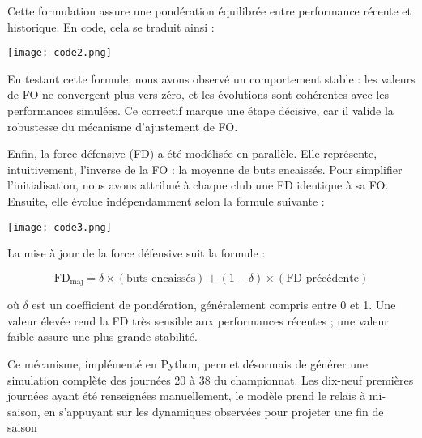 \documentclass[12pt]{report}
\begin{document}
Cette formulation assure une pondération équilibrée entre performance récente et historique. En code, cela se traduit ainsi :


\begin{tcolorbox}[
  colback=white, colframe=red!80!black,
  title=\textcolor{white}{\textbf{Mise à jour de la FO}},
  coltitle=white, colbacktitle=red!80!black,
  boxrule=0.8pt,
  left=4pt, right=4pt, top=5pt, bottom=5pt,
  boxsep=5pt, %
  enhanced, sharp corners
]
\centering
\texttt{[image: code2.png]}
\end{tcolorbox}




En testant cette formule, nous avons observé un comportement stable : les valeurs de FO ne convergent plus vers zéro, et les évolutions sont cohérentes avec les performances simulées. Ce correctif marque une étape décisive, car il valide la robustesse du mécanisme d’ajustement de FO.

Enfin, la force défensive (FD) a été modélisée en parallèle. Elle représente, intuitivement, l’inverse de la FO : la moyenne de buts encaissés. Pour simplifier l’initialisation, nous avons attribué à chaque club une FD identique à sa FO. Ensuite, elle évolue indépendamment selon la formule suivante :
\begin{tcolorbox}[
  colback=white, colframe=red!80!black,
  title=\textcolor{white}{\textbf{Mise à jour de la FD}},
  coltitle=white, colbacktitle=red!80!black,
  boxrule=0.8pt,
  left=4pt, right=4pt, top=5pt, bottom=5pt,
  boxsep=5pt,
  enhanced, sharp corners
]
\centering
\texttt{[image: code3.png]}
\end{tcolorbox}

La mise à jour de la force défensive suit la formule : 
\begin{tcolorbox}[colback=white!95!gray, colframe=blue!65!black, title=\textbf{Formule de mise à jour de la FD}]
\[
\text{FD}_{\text{maj}} = \delta \times (\text{buts encaissés}) + (1 - \delta) \times (\text{FD précédente})
\]
\end{tcolorbox}



où $\delta$ est un coefficient de pondération, généralement compris entre 0 et 1. Une valeur élevée rend la FD très sensible aux performances récentes ; une valeur faible assure une plus grande stabilité.

Ce mécanisme, implémenté en Python, permet désormais de générer une simulation complète des journées 20 à 38 du championnat. Les dix-neuf premières journées ayant été renseignées manuellement, le modèle prend le relais à mi-saison, en s’appuyant sur les dynamiques observées pour projeter une fin de saison 
\end{document}
